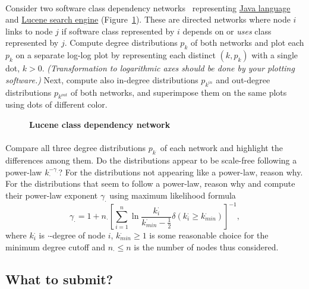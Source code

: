 \documentclass[11pt,a4paper]{article}
\newcommand{\hint}[1]{{\it (#1)}}
\newcommand{\figref}[1]{{\color{LimeGreen}Figure~\ref{fig:#1}}}
\begin{document}
\paragraph{} Consider two software class dependency networks~\cite{SB11b} representing \href{http://lovro.lpt.fri.uni-lj.si/ina/nets/java}{Java language} and \href{http://lovro.lpt.fri.uni-lj.si/ina/nets/lucene}{Lucene search engine} (\figref{lucene}). These are directed networks where node $i$ links to node $j$ if software class represented by $i$ depends on or {\it uses} class represented by $j$. Compute degree distributions $p_k$ of both networks and plot each $p_k$ on a separate log-log plot by representing each distinct $(k,p_k)$ with a single dot, $k>0$. \hint{Transformation to logarithmic axes should be done by your plotting software.} Next, compute also in-degree distributions $p_{k^{in}}$ and out-degree distributions $p_{k^{out}}$ of both networks, and superimpose them on the same plots using dots of different color. 

\begin{figure}[h] \centering
	\caption{{\bf Lucene class dependency network}}
	\label{fig:lucene}
\end{figure}

\paragraph{} Compare all three degree distributions $p_{k^{\cdot}}$ of each network and highlight the differences among them. Do the distributions appear to be scale-free following a power-law $k_{\cdot}^{-\gamma_{\cdot}}$? For the distributions not appearing like a power-law, reason why. For the distributions that seem to follow a power-law, reason why and compute their power-law exponent $\gamma_{\cdot}$ using maximum likelihood formula~\cite{Bar16}
$$\gamma_{\cdot}=1+n_{\cdot}\left[\sum_{i=1}^{n}\ln\frac{k_i^{\cdot}}{k_{min}^{\cdot}-\frac{1}{2}}\delta(k_i^{\cdot}\geq k_{min}^{\cdot})\right]^{-1},$$
where $k_i^{\cdot}$ is $\cdot$-degree of node $i$, $k_{min}^{\cdot}\geq 1$ is some reasonable choice for the minimum degree cutoff and $n_{\cdot}\leq n$ is the number of nodes thus considered.

\subsection*{What to submit?}
\end{document}
